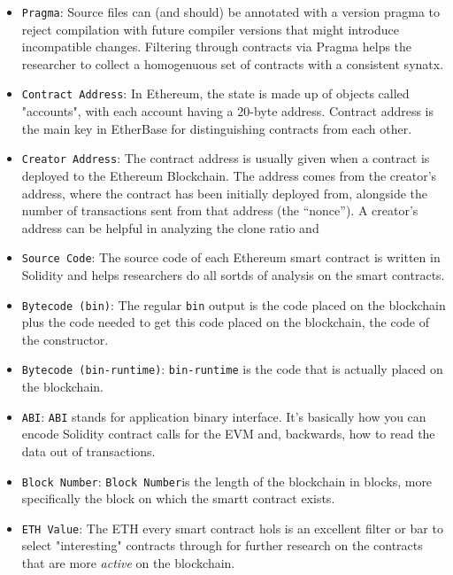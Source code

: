 	\begin{itemize}

		\item{\verb|Pragma|: Source files can (and should) be annotated with a version pragma to reject compilation with future compiler versions that might introduce incompatible changes. Filtering through contracts via Pragma helps the researcher to collect a homogenuous set of contracts with a consistent synatx.}\\

		\item{\verb|Contract Address|: In Ethereum, the state is made up of objects called "accounts", with each account having a 20-byte address. Contract address is the main key in EtherBase for distinguishing contracts from each other.}\\

		\item{\verb|Creator Address|: The contract address is usually given when a contract is deployed to the Ethereum Blockchain. The address comes from the creator's address, where the contract has been initially deployed from, alongside the number of transactions sent from that address (the “nonce”). A creator's address can be helpful in analyzing the clone ratio and }\\

		\item{\verb|Source Code|: The source code of each Ethereum smart contract is written in Solidity and helps researchers do all sortds of analysis on the smart contracts.}\\

		\item{\verb|Bytecode (bin)|: The regular \verb|bin| output is the code placed on the blockchain plus the code needed to get this code placed on the blockchain, the code of the constructor.}\\

		\item{\verb|Bytecode (bin-runtime)|: \verb|bin-runtime| is the code that is actually placed on the blockchain.}\\

		\item{\verb|ABI|: \verb|ABI| stands for application binary interface. It's basically how you can encode Solidity contract calls for the EVM and, backwards, how to read the data out of transactions.}\\

		\item{\verb|Block Number|: \verb|Block Number|is the length of the blockchain in blocks, more specifically the block on which the smartt contract exists.}\\
		\item \verb|ETH Value|: The ETH every smart contract hols is an excellent filter or bar to select "interesting" contracts through for further research on the contracts that are more \emph{active} on the blockchain.\\


\end{itemize}
